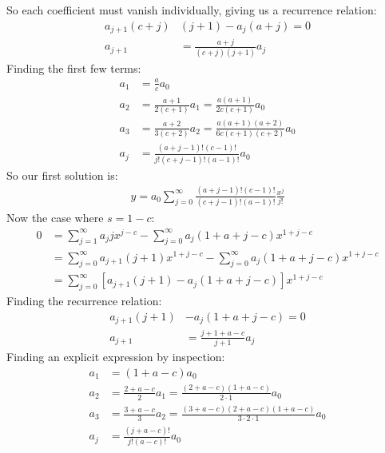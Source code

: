 \documentclass{article}
\begin{document}
So each coefficient must vanish individually, giving us a recurrence relation:
\begin{equation*}
\begin{aligned}
	a_{j+1}(c+j)&(j+1)-a_j(a+j)=0 \\
	a_{j+1} &= \frac{a+j}{(c+j)(j+1)}a_j
\end{aligned}
\end{equation*}
Finding the first few terms:
\begin{equation*}
\begin{aligned}
	a_1 &= \frac{a}{c}a_0 \\
	a_2 &= \frac{a+1}{2(c+1)}a_1 = \frac{a(a+1)}{2c(c+1)}a_0 \\
	a_3 &= \frac{a+2}{3(c+2)}a_2 = \frac{a(a+1)(a+2)}{6c(c+1)(c+2)}a_0 \\
	a_j &= \frac{(a+j-1)!(c-1)!}{j!(c+j-1)!(a-1)!}a_0
\end{aligned}
\end{equation*}
So our first solution is:
\begin{equation*}
\begin{aligned}
	\boxed{y = a_0\sum_{j=0}^\infty \frac{(a+j-1)!(c-1)!}{(c+j-1)!(a-1)!} \frac{x^{j}}{j!}}
\end{aligned}
\end{equation*}
Now the case where $s=1-c$:\\
\begin{equation*}
\begin{aligned}
	0 &= \sum_{j=1}^\infty a_j jx^{j-c} - \sum_{j=0}^\infty a_j(1+a+j-c)x^{1+j-c} \\
	&= \sum_{j=0}^\infty a_{j+1} (j+1)x^{1+j-c} - \sum_{j=0}^\infty a_j(1+a+j-c)x^{1+j-c} \\
	&= \sum_{j=0}^\infty \left[a_{j+1}(j+1)-a_j(1+a+j-c)\right]x^{1+j-c}
\end{aligned}
\end{equation*}
Finding the recurrence relation:
\begin{equation*}
\begin{aligned}
	a_{j+1}(j+1)&-a_j(1+a+j-c) = 0 \\
	a_{j+1} &= \frac{j+1+a-c}{j+1}a_j
\end{aligned}
\end{equation*}
Finding an explicit expression by inspection:
\begin{equation*}
\begin{aligned}
	a_1 &= (1+a-c)a_0 \\
	a_2 &= \frac{2+a-c}{2}a_1 = \frac{(2+a-c)(1+a-c)}{2\cdot 1}a_0 \\
	a_3 &= \frac{3+a-c}{3}a_2 = \frac{(3+a-c)(2+a-c)(1+a-c)}{3\cdot 2\cdot 1}a_0 \\
	a_j &= \frac{(j+a-c)!}{j!(a-c)!}a_0
\end{aligned}
\end{equation*}
\end{document}
